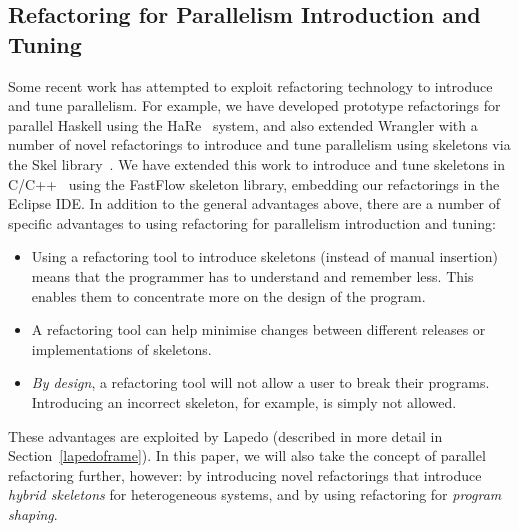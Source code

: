 \documentclass[final]{jfp1}
\newcommand{\lapedo}{\xspace{\sc Lapedo}\xspace}
\newcommand{\Lapedo}{\lapedo}
\begin{document}
\subsection{Refactoring for Parallelism Introduction and Tuning}


Some recent work has attempted to exploit refactoring technology to
introduce and tune parallelism.  For example, we have developed
prototype refactorings for parallel Haskell using the HaRe~\cite{hare} system,
and also extended Wrangler with a number of novel refactorings to
introduce and tune parallelism using skeletons via
the Skel library~\cite{hlpp}.  We have extended this work to
introduce and tune skeletons in C/C++~\cite{pdp2014}
using the FastFlow skeleton library, embedding our refactorings in the
Eclipse IDE.
%
In addition to the general advantages above, there are a number of specific advantages to using refactoring for parallelism
introduction and tuning:
\begin{itemize}
\item Using a refactoring tool to introduce skeletons (instead of
  manual insertion) means that the programmer has to understand and
  remember less. This enables them to concentrate more on the
  design of the program.
\item A refactoring tool can help minimise changes
 between different releases or implementations of skeletons.
\item \emph{By design}, a refactoring tool will not allow a user to break their
  programs. Introducing an incorrect skeleton, for example, is simply not
  allowed.
\end{itemize}

\noindent
These advantages are exploited by \Lapedo{} (described in more detail in Section~\ref{lapedoframe}).
In this paper, we will also take the concept of parallel refactoring further, however: by
introducing novel refactorings that introduce \emph{hybrid skeletons} for
heterogeneous systems, and by using refactoring for \emph{program
  shaping}.
\end{document}
